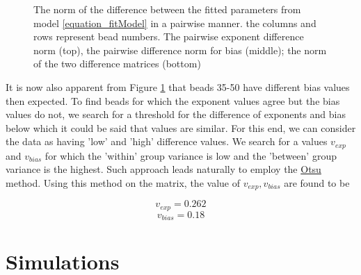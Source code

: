\documentclass[12pt]{book}
\begin{document}
\begin{figure}[H]
\caption{\scriptsize{The norm of the difference between the fitted parameters from model \ref{equation_fitModel} in a pairwise manner. the columns and rows represent bead numbers. The pairwise exponent difference norm (top), the pairwise difference norm for bias (middle); the norm of the two difference matrices (bottom)}}
\label{figure_diffFittedParametersRep1}
\end{figure}

It is now also apparent from Figure \ref{figure_diffFittedParametersRep1} that beads 35-50 have different bias values then expected. To find beads for which the exponent values agree but the bias values do not, we search for a threshold for the difference of exponents and bias below which it could be said that values are similar. 
For this end, we can consider the data as having 'low' and 'high' difference values. 
We search for a values $v_{exp}$ and $v_{bias}$ for which the 'within' group variance is low and the 'between' group variance is the highest. 
Such approach leads naturally to employ the \href{http://en.wikipedia.org/wiki/Otsu's_method}{Otsu} method. Using this method on the matrix, the value of $v_{exp},v_{bias}$ are found to be 

\begin{equation*}
v_{exp}= 0.262
\end{equation*}
\begin{equation*}
v_{bias}=0.18
\end{equation*}

\chapter{Simulations}
\end{document}
